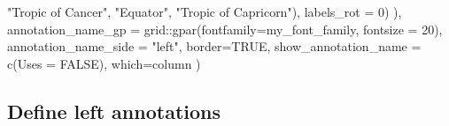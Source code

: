 \documentclass[
]{article}
\newenvironment{Shaded}{\begin{snugshade}}{\end{snugshade}}
\newcommand{\AttributeTok}[1]{\textcolor[rgb]{0.77,0.63,0.00}{#1}}
\newcommand{\ConstantTok}[1]{\textcolor[rgb]{0.00,0.00,0.00}{#1}}
\newcommand{\DecValTok}[1]{\textcolor[rgb]{0.00,0.00,0.81}{#1}}
\newcommand{\FunctionTok}[1]{\textcolor[rgb]{0.00,0.00,0.00}{#1}}
\newcommand{\NormalTok}[1]{#1}
\newcommand{\SpecialCharTok}[1]{\textcolor[rgb]{0.00,0.00,0.00}{#1}}
\newcommand{\StringTok}[1]{\textcolor[rgb]{0.31,0.60,0.02}{#1}}
\begin{document}
\begin{Shaded}
\begin{Highlighting}[]
                                           \StringTok{"Tropic of Cancer"}\NormalTok{,}
                                           \StringTok{"Equator"}\NormalTok{,}
                                           \StringTok{"Tropic of Capricorn"}\NormalTok{),}
                                  \AttributeTok{labels\_rot =} \DecValTok{0}\NormalTok{)}
\NormalTok{                            ),}
  \AttributeTok{annotation\_name\_gp =}\NormalTok{ grid}\SpecialCharTok{::}\FunctionTok{gpar}\NormalTok{(}\AttributeTok{fontfamily=}\NormalTok{my\_font\_family, }\AttributeTok{fontsize =} \DecValTok{20}\NormalTok{),}
  \AttributeTok{annotation\_name\_side =} \StringTok{"left"}\NormalTok{,}
  \AttributeTok{border=}\ConstantTok{TRUE}\NormalTok{,}
  \AttributeTok{show\_annotation\_name =} \FunctionTok{c}\NormalTok{(}\AttributeTok{Uses =} \ConstantTok{FALSE}\NormalTok{),}
  \AttributeTok{which=}\StringTok{\textquotesingle{}column\textquotesingle{}}
\NormalTok{)}
\end{Highlighting}
\end{Shaded}

\hypertarget{define-left-annotations}{%
\subsection{Define left annotations}\label{define-left-annotations}}
\end{document}
